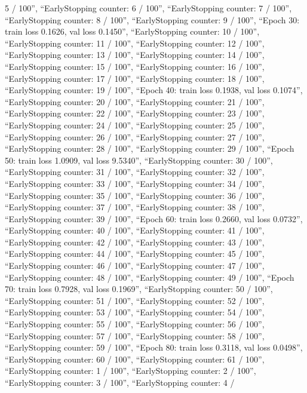 \documentclass[
]{article}
\begin{document}
5 / 100\n'', ``EarlyStopping counter: 6 / 100\n'', ``EarlyStopping
counter: 7 / 100\n'', ``EarlyStopping counter: 8 / 100\n'',
``EarlyStopping counter: 9 / 100\n'', ``Epoch 30: train loss 0.1626, val
loss 0.1450\n'', ``EarlyStopping counter: 10 / 100\n'', ``EarlyStopping
counter: 11 / 100\n'', ``EarlyStopping counter: 12 / 100\n'',
``EarlyStopping counter: 13 / 100\n'', ``EarlyStopping counter: 14 /
100\n'', ``EarlyStopping counter: 15 / 100\n'', ``EarlyStopping counter:
16 / 100\n'', ``EarlyStopping counter: 17 / 100\n'', ``EarlyStopping
counter: 18 / 100\n'', ``EarlyStopping counter: 19 / 100\n'', ``Epoch
40: train loss 0.1938, val loss 0.1074\n'', ``EarlyStopping counter: 20
/ 100\n'', ``EarlyStopping counter: 21 / 100\n'', ``EarlyStopping
counter: 22 / 100\n'', ``EarlyStopping counter: 23 / 100\n'',
``EarlyStopping counter: 24 / 100\n'', ``EarlyStopping counter: 25 /
100\n'', ``EarlyStopping counter: 26 / 100\n'', ``EarlyStopping counter:
27 / 100\n'', ``EarlyStopping counter: 28 / 100\n'', ``EarlyStopping
counter: 29 / 100\n'', ``Epoch 50: train loss 1.0909, val loss
9.5340\n'', ``EarlyStopping counter: 30 / 100\n'', ``EarlyStopping
counter: 31 / 100\n'', ``EarlyStopping counter: 32 / 100\n'',
``EarlyStopping counter: 33 / 100\n'', ``EarlyStopping counter: 34 /
100\n'', ``EarlyStopping counter: 35 / 100\n'', ``EarlyStopping counter:
36 / 100\n'', ``EarlyStopping counter: 37 / 100\n'', ``EarlyStopping
counter: 38 / 100\n'', ``EarlyStopping counter: 39 / 100\n'', ``Epoch
60: train loss 0.2660, val loss 0.0732\n'', ``EarlyStopping counter: 40
/ 100\n'', ``EarlyStopping counter: 41 / 100\n'', ``EarlyStopping
counter: 42 / 100\n'', ``EarlyStopping counter: 43 / 100\n'',
``EarlyStopping counter: 44 / 100\n'', ``EarlyStopping counter: 45 /
100\n'', ``EarlyStopping counter: 46 / 100\n'', ``EarlyStopping counter:
47 / 100\n'', ``EarlyStopping counter: 48 / 100\n'', ``EarlyStopping
counter: 49 / 100\n'', ``Epoch 70: train loss 0.7928, val loss
0.1969\n'', ``EarlyStopping counter: 50 / 100\n'', ``EarlyStopping
counter: 51 / 100\n'', ``EarlyStopping counter: 52 / 100\n'',
``EarlyStopping counter: 53 / 100\n'', ``EarlyStopping counter: 54 /
100\n'', ``EarlyStopping counter: 55 / 100\n'', ``EarlyStopping counter:
56 / 100\n'', ``EarlyStopping counter: 57 / 100\n'', ``EarlyStopping
counter: 58 / 100\n'', ``EarlyStopping counter: 59 / 100\n'', ``Epoch
80: train loss 0.3118, val loss 0.0498\n'', ``EarlyStopping counter: 60
/ 100\n'', ``EarlyStopping counter: 61 / 100\n'', ``EarlyStopping
counter: 1 / 100\n'', ``EarlyStopping counter: 2 / 100\n'',
``EarlyStopping counter: 3 / 100\n'', ``EarlyStopping counter: 4 /
\end{document}
